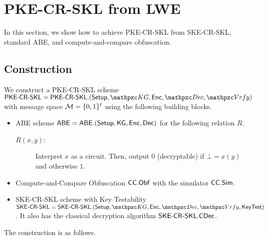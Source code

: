 
\section{PKE-CR-SKL from LWE}\label{sec:PKE-CR-SKL}

In this section, we show how to achieve PKE-CR-SKL from SKE-CR-SKL, standard ABE, and compute-and-compare obfuscation.

\subsection{Construction}
We construct a PKE-CR-SKL scheme
$\PKECRSKL=\PKECRSKL.(\Setup,\qKG,\allowbreak\Enc,\qDec,\qVrfy)$ with
message space $\mathcal{M} = \{0,1\}^{\ell}$ using the following building blocks.

\begin{itemize}
\item ABE scheme $\mathsf{ABE}=\mathsf{ABE}.(\mathsf{Setup},\mathsf{KG},\mathsf{Enc},\mathsf{Dec})$ for the following relation $R$.
\begin{description}
\item[$R(x,y)$:] Interpret $x$ as a circuit. Then, output $0$ (decryptable) if $\bot=x(y)$ and otherwise $1$.
\end{description}
\item Compute-and-Compare Obfuscation $\mathsf{CC}.\mathsf{Obf}$ with the simulator $\mathsf{CC}.\mathsf{Sim}$.


\item SKE-CR-SKL scheme with Key Testability
$\SKECRSKL=\SKECRSKL.(\Setup,\allowbreak\qKG,\Enc,\qDec,\qVrfy,\KeyTest)$. It also has the classical decryption algorithm $\mathsf{SKE}\textrm{-}\mathsf{CR}\textrm{-}\mathsf{SKL}.\mathsf{CDec}$.
\end{itemize} 

The construction is as follows.

